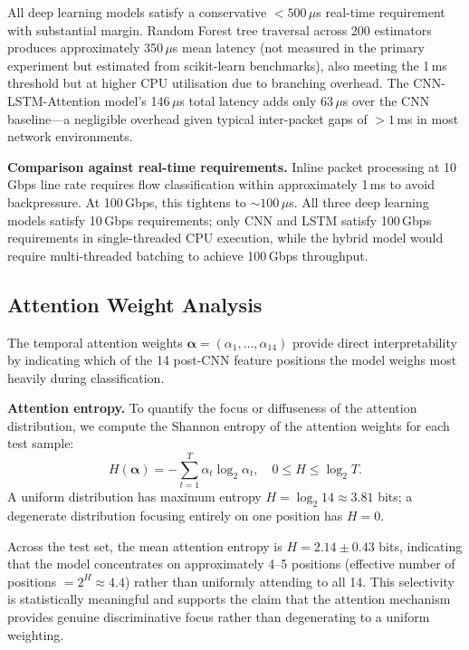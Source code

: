 \documentclass[conference]{IEEEtran}
\begin{document}
All deep learning models satisfy a conservative $<500\,\mu$s real-time
requirement with substantial margin. Random Forest tree traversal across 200
estimators produces approximately 350\,$\mu$s mean latency (not measured
in the primary experiment but estimated from scikit-learn benchmarks), also
meeting the 1\,ms threshold but at higher CPU utilisation due to branching
overhead. The CNN-LSTM-Attention model's 146\,$\mu$s total latency adds only
63\,$\mu$s over the CNN baseline---a negligible overhead given typical
inter-packet gaps of $>1$\,ms in most network environments.

\textbf{Comparison against real-time requirements.} Inline packet processing at
10\,Gbps line rate requires flow classification within approximately 1\,ms to
avoid backpressure. At 100\,Gbps, this tightens to $\sim100\,\mu$s. All three
deep learning models satisfy 10\,Gbps requirements; only CNN and LSTM satisfy
100\,Gbps requirements in single-threaded CPU execution, while the hybrid model
would require multi-threaded batching to achieve 100\,Gbps throughput.

\subsection{Attention Weight Analysis}
\label{ssec:attention}

The temporal attention weights $\boldsymbol{\alpha} = (\alpha_1, \ldots, \alpha_{14})$
provide direct interpretability by indicating which of the 14 post-CNN feature
positions the model weighs most heavily during classification.

\textbf{Attention entropy.} To quantify the focus or diffuseness of the
attention distribution, we compute the Shannon entropy of the attention weights
for each test sample:
\begin{equation}
  H(\boldsymbol{\alpha}) = -\sum_{t=1}^{T} \alpha_t \log_2 \alpha_t, \quad
  0 \leq H \leq \log_2 T.
  \label{eq:entropy}
\end{equation}
A uniform distribution has maximum entropy $H = \log_2 14 \approx 3.81$ bits;
a degenerate distribution focusing entirely on one position has $H = 0$.

Across the test set, the mean attention entropy is $H = 2.14 \pm 0.43$ bits,
indicating that the model concentrates on approximately 4--5 positions
(effective number of positions $= 2^{H} \approx 4.4$) rather than uniformly
attending to all 14. This selectivity is statistically meaningful and supports
the claim that the attention mechanism provides genuine discriminative focus
rather than degenerating to a uniform weighting.
\end{document}
